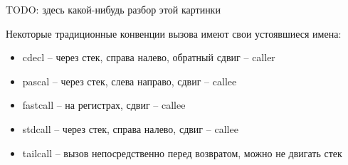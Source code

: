 \documentclass[a4paper,12pt,oneside]{article}
\begin{document}
TODO: здесь какой-нибудь разбор этой картинки

Некоторые традиционные конвенции вызова имеют свои устоявшиеся имена:

\begin{itemize}
\item cdecl – через стек, справа налево, обратный сдвиг – caller 
\item pascal – через стек, слева направо, сдвиг – callee
\item fastcall – на регистрах, сдвиг – callee
\item stdcall – через стек, справа налево, сдвиг – callee
\item tailcall – вызов непосредственно перед возвратом, можно не двигать стек
\end{itemize}
\end{document}
